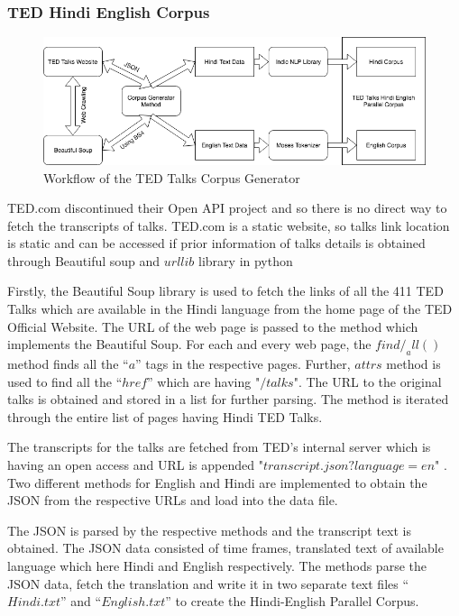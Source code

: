 \subsubsection{TED Hindi English Corpus}
\begin{figure}
\includegraphics[width=\textwidth]{figures/traindataworkflow.png}
\caption{Workflow of the TED Talks Corpus Generator} \label{fig1}
\end{figure}
TED.com discontinued their Open API project and so there is no direct way to fetch the transcripts of talks. TED.com is a static website, so talks link location is static and can be accessed if prior information of talks details is obtained through Beautiful soup and $urllib$ library in python 

Firstly, the Beautiful Soup library is used to fetch the links of all the 411 TED Talks which are available in the Hindi language from the home page of the TED Official Website. The URL of the web page is passed to the method which implements the Beautiful Soup.  For each and every web page, the $find/_all()$ method finds all the “$a$” tags in the respective pages. Further, $attrs$ method is used to find all the $“href”$ which are having "$/talks$". The URL to the original talks is obtained and stored in a list for further parsing. The method is iterated through the entire list of pages having Hindi TED Talks. 

The transcripts for the talks are fetched from TED’s internal server which is having an open access and URL is appended "$transcript.json?language=en$" . Two different methods for English and Hindi are implemented to obtain the JSON from the respective URLs and load into the data file. 

The JSON is parsed by the respective methods and the transcript text is obtained. The JSON data consisted of time frames, translated text of available language which here Hindi and English respectively. The methods parse the JSON data, fetch the translation and write it in two separate text files “$Hindi.txt$” and “$English.txt$” to create the Hindi-English Parallel Corpus.

